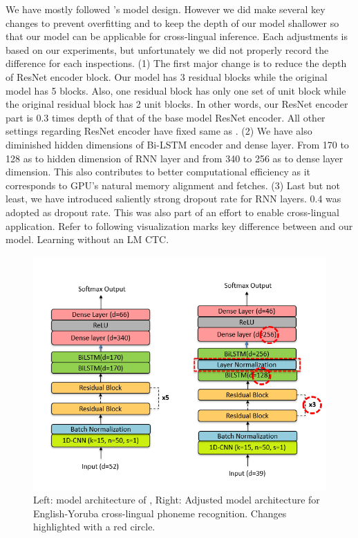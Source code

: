 \documentclass[11pt]{article}
\begin{document}
{We have mostly followed \cite{dhakal2022automatic}'s model design. However we did make several key changes to prevent overfitting and to keep the depth of our model shallower so that our model can be applicable for cross-lingual inference. Each adjustments is based on our experiments, but unfortunately we did not properly record the difference for each inspections. (1) The first major change is to reduce the depth of ResNet encoder block. Our model has 3 residual blocks while the original model has 5 blocks. Also, one residual block has only one set of unit block while the original residual block has 2 unit blocks. In other words, our ResNet encoder part is 0.3 times depth of that of the base model ResNet encoder. All other settings regarding ResNet encoder have fixed same as \cite{dhakal2022automatic}. (2) We have also diminished hidden dimensions of Bi-LSTM encoder and dense layer. From 170 to 128 as to hidden dimension of RNN layer and from 340 to 256 as to dense layer dimension. This also contributes to better computational efficiency as it corresponds to GPU's natural memory alignment and fetches. (3) Last but not least, we have introduced saliently strong dropout rate for RNN layers. 0.4 was adopted as dropout rate. This was also part of an effort to enable cross-lingual application. Refer to following visualization marks key difference between \cite{dhakal2022automatic} and our model.
Learning without an LM CTC.
\begin{figure}
    \centering
    \includegraphics[width=1\linewidth]{modelarchitecture+.png}
    \caption{Left: model architecture of \cite{dhakal2022automatic} , Right: Adjusted model architecture for English-Yoruba cross-lingual phoneme recognition. Changes highlighted with a red circle.}
    \label{fig:architecture}
\end{figure}


}
\end{document}
